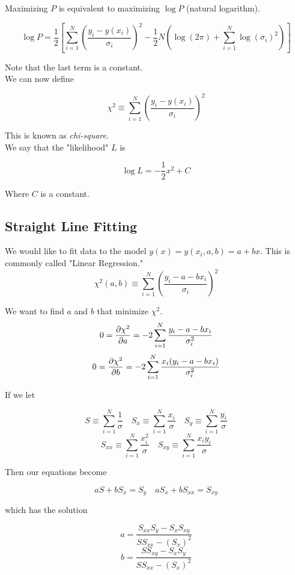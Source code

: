 \documentclass[]{article}
\begin{document}
Maximizing $P$ is equivalent to maximizing $\log P$ (natural logarithm). 

\[\log P = \frac{1}{2}\left[ \sum_{i=1}^N \left(\frac{y_i - y(x_i)}{\sigma_i}\right)^2 - \frac{1}{2}N\left(\log(2\pi) + \sum_{i=1}^N \log(\sigma_i)^2\right)\right] \]

Note that the last term is a constant.\\

We can now define

\[\chi^2 \equiv \sum_{i=1}^N \left(\frac{y_i - y(x_i)}{\sigma_i}\right)^2\]

This is known as \textit{chi-square}.\\

We say that the "likelihood" $L$ is

\[\log L = -\frac{1}{2}x^2 + C\]

Where $C$ is a constant.\\


\subsection{Straight Line Fitting}\bigbreak

We would like to fit data to the model $y(x) = y(x_i, a, b) = a+bx$. This is commonly called "Linear Regression."\\

\[\chi^2(a, b) \equiv \sum_{i=1}^N \left(\frac{y_i - a - bx_i}{\sigma_i}\right)^2\]

We want to find $a$ and $b$ that minimize $\chi^2$. \\

\[0=\pdv{\chi^2}{a} = -2\sum_{i=1}^N \frac{y_i - a - bx_i}{\sigma_i^2} \]
\[0=\pdv{\chi^2}{b} = -2\sum_{i=1}^N \frac{x_i(y_i - a - bx_i)}{\sigma_i^2} \]

If we let 

\[S \equiv \sum_{i=1}^N \frac{1}{\sigma} \quad S_x \equiv \sum_{i=1}^N \frac{x_i}{\sigma} \quad S_y \equiv \sum_{i=1}^N \frac{y_i}{\sigma}\]
\[S_{xx} \equiv \sum_{i=1}^N \frac{x_i^2}{\sigma} \quad S_{xy} \equiv \sum_{i=1}^N \frac{x_iy_i}{\sigma}\]

Then our equations become

\[aS + bS_x = S_y \quad aS_x + bS_{xx} = S_{xy}\]

which has the solution

\[a = \frac{S_{xx}S_{y} - S_{x}S_{xy}}{S S_{xx} - (S_{x})^2}\]
\[b = \frac{S S_{xy} - S_{x}S_{y}}{S S_{xx} - (S_{x})^2}\]
\end{document}
